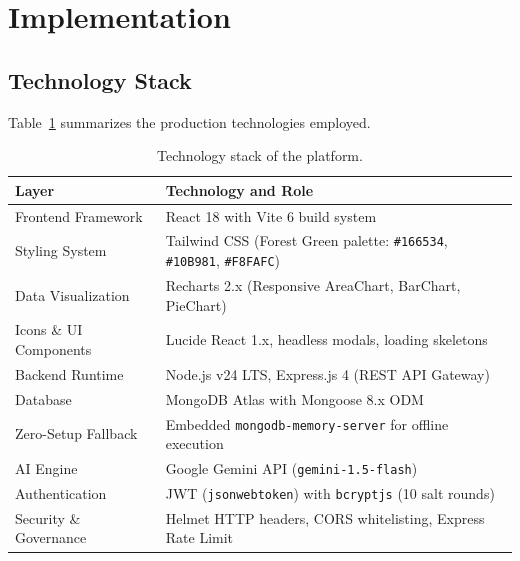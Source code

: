 \documentclass[12pt,a4paper]{article}
\begin{document}
\section{Implementation}

\subsection{Technology Stack}
Table~\ref{tab:techstack} summarizes the production technologies employed.

\begin{table}[htbp]
\centering
\small
\begin{tabular}{@{}lp{10.2cm}@{}}
\toprule
\textbf{Layer} & \textbf{Technology and Role} \\ \midrule
Frontend Framework & React 18 with Vite 6 build system \\
Styling System & Tailwind CSS (Forest Green palette: \texttt{\#166534}, \texttt{\#10B981}, \texttt{\#F8FAFC}) \\
Data Visualization & Recharts 2.x (Responsive AreaChart, BarChart, PieChart) \\
Icons \& UI Components & Lucide React 1.x, headless modals, loading skeletons \\
Backend Runtime & Node.js v24 LTS, Express.js 4 (REST API Gateway) \\
Database & MongoDB Atlas with Mongoose 8.x ODM \\
Zero-Setup Fallback & Embedded \texttt{mongodb-memory-server} for offline execution \\
AI Engine & Google Gemini API (\texttt{gemini-1.5-flash}) \\
Authentication & JWT (\texttt{jsonwebtoken}) with \texttt{bcryptjs} (10 salt rounds) \\
Security \& Governance & Helmet HTTP headers, CORS whitelisting, Express Rate Limit \\ \bottomrule
\end{tabular}
\caption{Technology stack of the platform.}
\label{tab:techstack}
\end{table}
\end{document}
